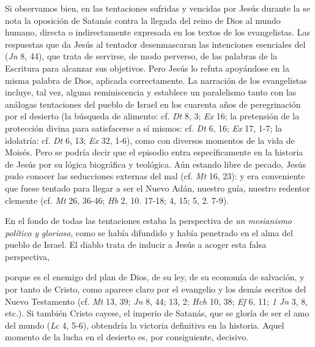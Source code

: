 \begin{patercite}[+] Si observamos bien, en las tentaciones sufridas y vencidas por Jesús durante la  se nota la oposición de Satanás contra la llegada del reino de Dios al mundo humano, directa o indirectamente expresada en los textos de los evangelistas. Las respuestas que da Jesús al tentador desenmascaran las intenciones esenciales del  (\textit{Jn} 8, 44), que trata de servirse, de modo perverso, de las palabras de la Escritura para alcanzar sus objetivos. Pero Jesús lo refuta apoyándose en la misma palabra de Dios, aplicada correctamente. La narración de los evangelistas incluye, tal vez, alguna reminiscencia y establece un paralelismo tanto con las análogas tentaciones del pueblo de Israel en los cuarenta años de peregrinación por el desierto (la búsqueda de alimento: cf. \textit{Dt} 8, 3; \textit{Ex} 16; la pretensión de la protección divina para satisfacerse a sí mismos: cf. \textit{Dt} 6, 16; \textit{Ex} 17, 1-7; la idolatría: cf. \textit{Dt} 6, 13; \textit{Ex} 32, 1-6), como con diversos momentos de la vida de Moisés. Pero se podría decir que el episodio entra específicamente en la historia de Jesús por su lógica biográfica y teológica. Aún estando libre de pecado, Jesús pudo conocer las seducciones externas del mal (cf. \textit{Mt} 16, 23): y era conveniente que fuese tentado para llegar a ser el Nuevo Adán, nuestro guía, nuestro redentor clemente (cf. \textit{Mt} 26, 36-46; \textit{Hb} 2, 10. 17-18; 4, 15; 5, 2. 7-9).\end{patercite}

\begin{patercite}En el fondo de todas las tentaciones estaba la perspectiva de \textit{un mesianismo político y} \textit{glorioso}, como se había difundido y había penetrado en el alma del pueblo de Israel. El diablo trata de inducir a Jesús a acoger esta falsa perspectiva, \end{patercite}

\begin{patercite}porque es el enemigo del plan de Dios, de su ley, de su economía de salvación, y por tanto de Cristo, como aparece claro por el evangelio y los demás escritos del Nuevo Testamento (cf. \textit{Mt} 13, 39; \textit{Jn} 8, 44; 13, 2; \textit{Hch} 10, 38; \textit{Ef} 6, 11; \textit{1 Jn} 3, 8, etc.). Si también Cristo cayese, el imperio de Satanás, que se gloría de ser el amo del mundo (\textit{Lc} 4, 5-6), obtendría la victoria definitiva en la historia. Aquel momento de la lucha en el desierto es, por consiguiente, decisivo.\end{patercite}

